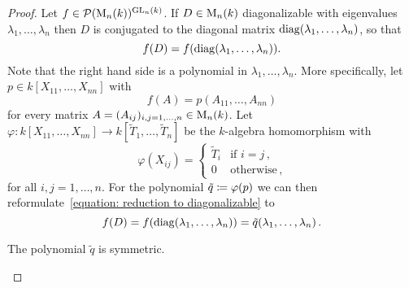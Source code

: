 \begin{proof}
  Let $f \in \mathcal{P}(\operatorname{M}_n(k))^{\operatorname{GL}_n(k)}$.
  If $D \in \operatorname{M}_n(k)$ diagonalizable with eigenvalues $\lambda_1, \dotsc, \lambda_n$ then $D$ is conjugated to the diagonal matrix $\operatorname{diag}(\lambda_1, \dotsc, \lambda_n)$, so that
  \begin{equation}
  \label{equation: reduction to diagonalizable}
      f(D)
    = f(\operatorname{diag}(\lambda_1, \dotsc, \lambda_n)).
  \end{equation}
  Note that the right hand side is a polynomial in $\lambda_1, \dotsc, \lambda_n$.
  More specifically, let $p \in k[X_{11}, \dotsc, X_{nn}]$ with
  \[
      f(A)
    = p(A_{11}, \dotsc, A_{nn})
  \]
  for every matrix $A = (A_{ij})_{i,j=1,\dotsc,n} \in \operatorname{M}_n(k)$.
  Let $\varphi \colon k[X_{11}, \dotsc, X_{nn}] \to k[\tilde{T}_1, \dotsc, \tilde{T}_n]$ be the $k$-algebra homomorphism with
  \[
      \varphi(X_{ij})
    = \begin{cases}
        \tilde{T}_i & \text{if $i = j$} \,, \\
                  0 & \text{otherwise}  \,,
      \end{cases}
  \]
  for all $i,j = 1, \dotsc, n$.
  For the polynomial $\tilde{q} \coloneqq \varphi(p)$ we can then reformulate~\eqref{equation: reduction to diagonalizable} to
  \begin{equation}
    \label{equation: reduction to diagonalizable second}
      f(D)
    = f(\operatorname{diag}(\lambda_1, \dotsc, \lambda_n))
    = \tilde{q}(\lambda_1, \dotsc, \lambda_n) \,.
  \end{equation}
  
  \begin{claim}
    The polynomial $\tilde{q}$ is symmetric.
  \end{claim}
    

\end{proof}
